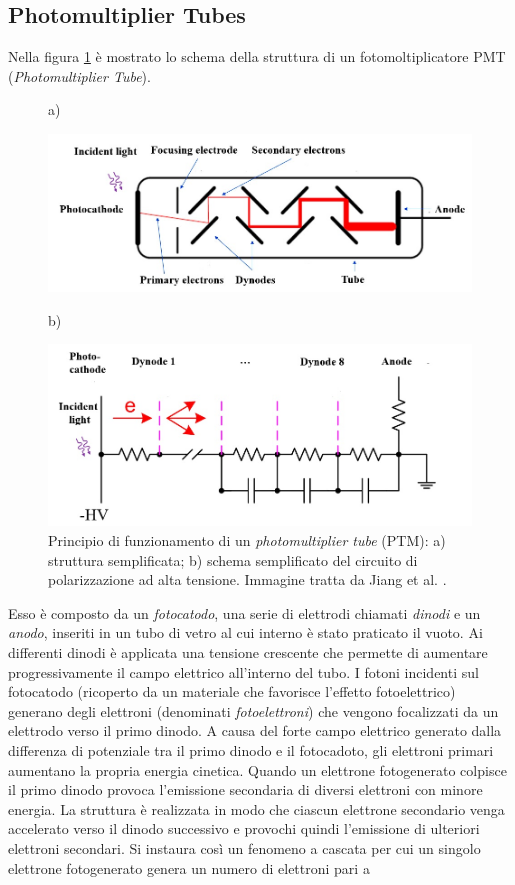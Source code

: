 \subsection{Photomultiplier Tubes}
Nella figura \ref{fig:ptm} è mostrato lo schema della struttura di un fotomoltiplicatore PMT (\textit{Photomultiplier Tube}).
\begin{figure}[b!]
	\centering
	a)
	\begin{minipage}{.70\textwidth}
		\includegraphics[width=\linewidth]{./ImageFiles/ptm.jpg}
	\end{minipage}

	b)
	\begin{minipage}{.70\textwidth}
		\includegraphics[width=\linewidth]{./ImageFiles/ptm_schema.jpg}
	\end{minipage}
	\caption{Principio di funzionamento di un \textit{photomultiplier tube} (PTM): a) struttura semplificata; b) schema semplificato del circuito di polarizzazione ad alta tensione. Immagine tratta da Jiang et al. \cite{Jiang2019}.}
	\label{fig:ptm}
\end{figure}
Esso è composto da un \textit{fotocatodo}, una serie di elettrodi chiamati \textit{dinodi} e un \textit{anodo}, inseriti in un tubo di vetro al cui interno è stato praticato il vuoto. Ai differenti dinodi è applicata una tensione crescente che permette di aumentare progressivamente il campo elettrico all'interno del tubo. I fotoni incidenti sul fotocatodo (ricoperto da un materiale che favorisce l'effetto fotoelettrico) generano degli elettroni (denominati \textit{fotoelettroni}) che vengono focalizzati da un elettrodo verso il primo dinodo. A causa del forte campo elettrico generato dalla differenza di potenziale tra il primo dinodo e il fotocadoto, gli elettroni primari aumentano la propria energia cinetica. Quando un elettrone fotogenerato colpisce il primo dinodo provoca l'emissione secondaria di diversi elettroni con minore energia. La struttura è realizzata in modo che ciascun elettrone secondario venga accelerato verso il dinodo successivo e provochi quindi l'emissione di ulteriori elettroni secondari. Si instaura così un fenomeno a cascata per cui un singolo elettrone fotogenerato genera un numero di elettroni pari a 

